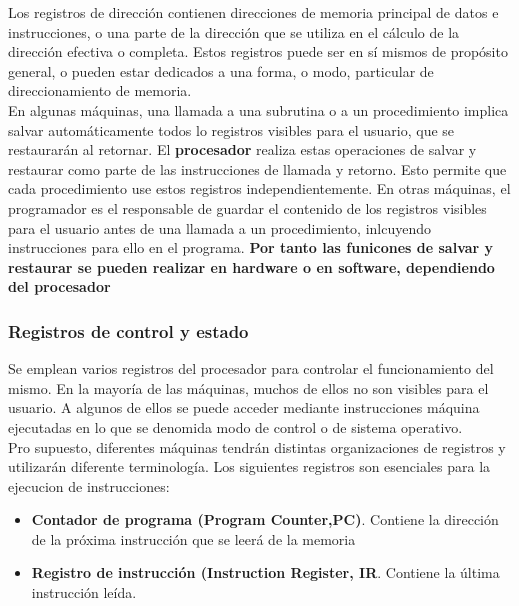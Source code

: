 \documentclass{article}
\begin{document}
			Los registros de dirección contienen direcciones de memoria principal de datos e instrucciones, o una parte de la dirección que se utiliza en el cálculo de la dirección efectiva o completa. Estos registros puede ser en sí mismos de propósito general, o pueden estar dedicados a una forma, o modo, particular de direccionamiento de memoria. \\
			
			En algunas máquinas, una llamada a una subrutina o a un procedimiento implica salvar automáticamente todos lo registros visibles para el usuario, que se restaurarán al retornar. El \textbf{procesador} realiza estas operaciones de salvar y restaurar como parte de las instrucciones de llamada y retorno. Esto permite que cada procedimiento use estos registros independientemente. En otras máquinas, el programador es el responsable de guardar el contenido de los registros visibles para el usuario antes de una llamada a un procedimiento, inlcuyendo instrucciones para ello en el programa. \textbf{Por tanto las funicones de salvar y restaurar se pueden realizar en hardware o en software, dependiendo del procesador}
			
		\subsubsection{Registros de control y estado}
			
			Se emplean varios registros del procesador para controlar el funcionamiento del mismo. En la mayoría de las máquinas, muchos de ellos no son visibles para el usuario. A algunos de ellos se puede acceder mediante instrucciones máquina ejecutadas en lo que se denomida modo de control o de sistema operativo. \\
			
			Pro supuesto, diferentes máquinas tendrán distintas organizaciones de registros y utilizarán diferente terminología. Los siguientes registros son esenciales para la ejecucion de instrucciones: 
			
			\begin{itemize}
				\item \textbf{Contador de programa (Program Counter,PC)}. Contiene la dirección de la próxima instrucción que se leerá de la memoria
				
				\item \textbf{Registro de instrucción (Instruction Register, IR}. Contiene la última instrucción leída.
			\end{itemize}
				
\end{document}
